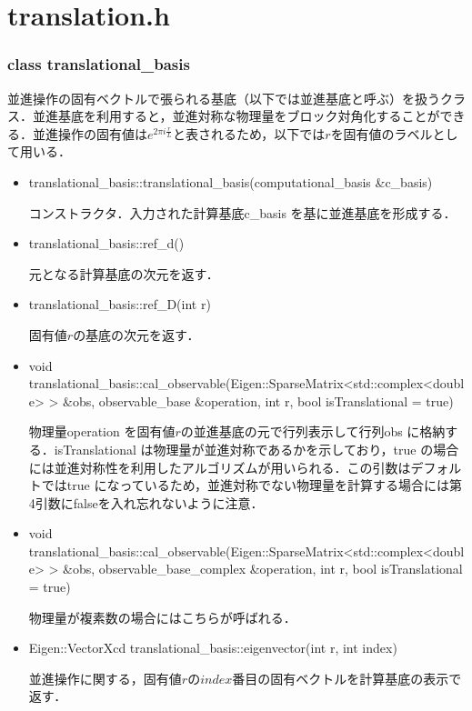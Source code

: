 \documentclass[report, 11pt, uplatex]{jsbook}
\begin{document}
	
	\section{translation.h}
	\subsubsection{class translational\_basis}
	並進操作の固有ベクトルで張られる基底（以下では並進基底と呼ぶ）を扱うクラス．並進基底を利用すると，並進対称な物理量をブロック対角化することができる．並進操作の固有値は$e^{2\pi i \frac{r}{L}}$と表されるため，以下では$r$を固有値のラベルとして用いる．
	
	\begin{itemize}
		\item translational\_basis::translational\_basis(computational\_basis \&c\_basis)
		
		コンストラクタ．入力された計算基底c\_basis を基に並進基底を形成する．
		
		\item translational\_basis::ref\_d()
		
		元となる計算基底の次元を返す．
		
		\item translational\_basis::ref\_D(int r)
		
		固有値$r$の基底の次元を返す．
		
		\item void translational\_basis::cal\_observable(Eigen::SparseMatrix<std::complex<double> > \&obs, observable\_base \&operation, int r, bool isTranslational = true)
		
		物理量operation を固有値$r$の並進基底の元で行列表示して行列obs に格納する．isTranslational は物理量が並進対称であるかを示しており，true の場合には並進対称性を利用したアルゴリズムが用いられる．この引数はデフォルトではtrue になっているため，並進対称でない物理量を計算する場合には第4引数にfalseを入れ忘れないように注意．
		
		\item void translational\_basis::cal\_observable(Eigen::SparseMatrix<std::complex<double> > \&obs, observable\_base\_complex \&operation, int r, bool isTranslational = true)
		
		物理量が複素数の場合にはこちらが呼ばれる．
		
		\item Eigen::VectorXcd translational\_basis::eigenvector(int r, int index)
		
		並進操作に関する，固有値$r$の$index$番目の固有ベクトルを計算基底の表示で返す．
		

\end{itemize}
\end{document}
